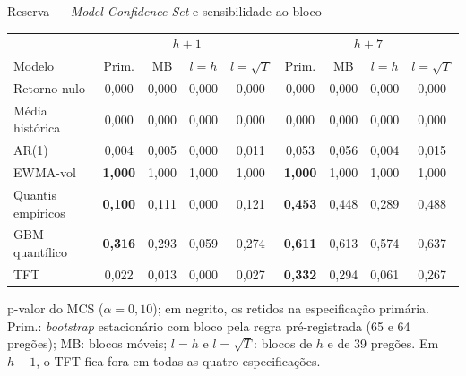 \documentclass[aspectratio=169,10pt]{beamer}
\newcommand{\hum}{\(h{+}1\)}
\newcommand{\hsete}{\(h{+}7\)}
\begin{document}
\begin{frame}{Reserva --- \textit{Model Confidence Set} e sensibilidade ao bloco}
  \footnotesize
  \centering
  \begin{tabular}{l c c c c c c c c}
    \toprule
    & \multicolumn{4}{c}{\hum} & \multicolumn{4}{c}{\hsete} \\
    Modelo & Prim. & MB & \(l{=}h\) & \(l{=}\sqrt{T}\) & Prim. & MB & \(l{=}h\) & \(l{=}\sqrt{T}\) \\
    \midrule
    Retorno nulo & 0,000 & 0,000 & 0,000 & 0,000 & 0,000 & 0,000 & 0,000 & 0,000 \\
    Média histórica & 0,000 & 0,000 & 0,000 & 0,000 & 0,000 & 0,000 & 0,000 & 0,000 \\
    AR(1) & 0,004 & 0,005 & 0,000 & 0,011 & 0,053 & 0,056 & 0,004 & 0,015 \\
    EWMA-vol & \textbf{1,000} & 1,000 & 1,000 & 1,000 & \textbf{1,000} & 1,000 & 1,000 & 1,000 \\
    Quantis empíricos & \textbf{0,100} & 0,111 & 0,000 & 0,121 & \textbf{0,453} & 0,448 & 0,289 & 0,488 \\
    GBM quantílico & \textbf{0,316} & 0,293 & 0,059 & 0,274 & \textbf{0,611} & 0,613 & 0,574 & 0,637 \\
    TFT & 0,022 & 0,013 & 0,000 & 0,027 & \textbf{0,332} & 0,294 & 0,061 & 0,267 \\
    \bottomrule
  \end{tabular}

  \vspace{6pt}
  \raggedright\small
  p-valor do MCS (\(\alpha = 0{,}10\)); em negrito, os retidos na especificação primária.
  Prim.: \textit{bootstrap} estacionário com bloco pela regra pré-registrada (65 e 64
  pregões); MB: blocos móveis; \(l{=}h\) e \(l{=}\sqrt{T}\): blocos de \(h\) e de 39 pregões.
  Em \hum, o TFT fica fora em todas as quatro especificações.
\end{frame}
\end{document}
